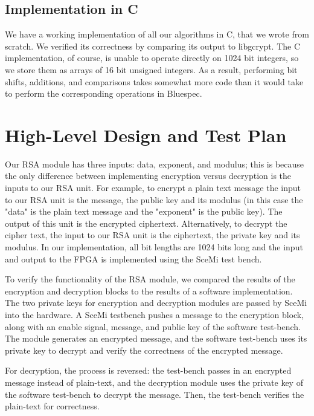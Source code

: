 \documentclass[a4paper,11pt]{report}
\begin{document}
\section{Implementation in C}
We have a working implementation of all our algorithms in C, that we wrote from scratch.
We verified its correctness by comparing its output to libgcrypt.  
The C implementation, of course, is unable to operate directly on 1024 bit integers, so we store them as arrays of 16 bit unsigned integers.
As a result, performing bit shifts, additions, and comparisons
takes somewhat more code than it would take to perform the corresponding operations in Bluespec.
\chapter*{High-Level Design and Test Plan} 
Our RSA module has three inputs: data, exponent, and modulus;
this is because the only difference between implementing encryption versus decryption is the inputs to our RSA unit.
For example, to encrypt a plain text message the input to our RSA unit is the message, the public key and its modulus
(in this case the "data" is the plain text message and the "exponent" is the public key).
The output of this unit is the encrypted ciphertext.
Alternatively, to decrypt the cipher text, the input to our RSA unit is the ciphertext, the private key and its modulus.
In our implementation, all bit lengths are 1024 bits long and the input and output to the FPGA is implemented using the SceMi test bench.

 

To verify the functionality of the RSA module, we compared the results of the encryption and decryption blocks to the results
of a software implementation. The two private keys for encryption and
decryption modules are passed by SceMi into the hardware. A SceMi testbench
pushes a message to the encryption block, along with an enable signal, message,
and public key of the software test-bench. The module generates an encrypted message,
and the software test-bench uses its private key to decrypt and verify the 
correctness of the encrypted message.

For decryption, the process is reversed: the test-bench passes in an 
encrypted message instead of plain-text, and the decryption module uses
the private key of the software test-bench to decrypt the message. Then, the test-bench
verifies the plain-text for correctness.
\end{document}
